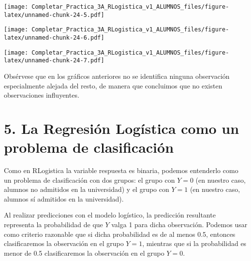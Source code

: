 \documentclass[
]{article}
\newenvironment{Shaded}{\begin{snugshade}}{\end{snugshade}}
\newcommand{\AttributeTok}[1]{\textcolor[rgb]{0.13,0.29,0.53}{#1}}
\newcommand{\DecValTok}[1]{\textcolor[rgb]{0.00,0.00,0.81}{#1}}
\newcommand{\FloatTok}[1]{\textcolor[rgb]{0.00,0.00,0.81}{#1}}
\newcommand{\FunctionTok}[1]{\textcolor[rgb]{0.13,0.29,0.53}{\textbf{#1}}}
\newcommand{\NormalTok}[1]{#1}
\newcommand{\OtherTok}[1]{\textcolor[rgb]{0.56,0.35,0.01}{#1}}
\newcommand{\SpecialCharTok}[1]{\textcolor[rgb]{0.81,0.36,0.00}{\textbf{#1}}}
\begin{document}
\texttt{[image: Completar\_Practica\_3A\_RLogistica\_v1\_ALUMNOS\_files/figure-latex/unnamed-chunk-24-5.pdf]}

\begin{Shaded}
\end{Shaded}

\texttt{[image: Completar\_Practica\_3A\_RLogistica\_v1\_ALUMNOS\_files/figure-latex/unnamed-chunk-24-6.pdf]}

\begin{Shaded}
\end{Shaded}

\texttt{[image: Completar\_Practica\_3A\_RLogistica\_v1\_ALUMNOS\_files/figure-latex/unnamed-chunk-24-7.pdf]}

Obsérvese que en los gráficos anteriores no se identifica ninguna
observación especialmente alejada del resto, de manera que concluimos
que no existen observaciones influyentes.

\hypertarget{la-regresiuxf3n-loguxedstica-como-un-problema-de-clasificaciuxf3n}{%
\section{5. La Regresión Logística como un problema de
clasificación}\label{la-regresiuxf3n-loguxedstica-como-un-problema-de-clasificaciuxf3n}}

Como en RLogistica la variable respuesta es binaria, podemos entenderlo
como un problema de clasificación con dos grupos: el grupo con \(Y=0\)
(en nuestro caso, alumnos no admitidos en la universidad) y el grupo con
\(Y=1\) (en nuestro caso, alumnos sí admitidos en la universidad).

Al realizar predicciones con el modelo logístico, la predicción
resultante representa la probabilidad de que \(Y\) valga 1 para dicha
observación. Podemos usar como criterio razonable que si dicha
probabilidad es de al menos 0.5, entonces clasificaremos la observación
en el grupo \(Y=1\), mientras que si la probabilidad es menor de 0.5
clasificaremos la observación en el grupo \(Y=0\).

\begin{Shaded}
\end{Shaded}
\end{document}

